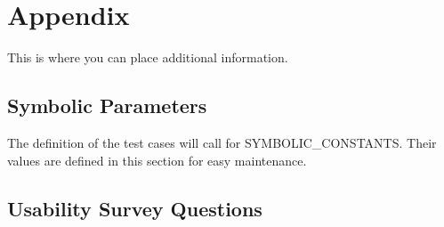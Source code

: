 \documentclass[12pt, titlepage]{article}
\begin{document}
\newpage

\section{Appendix}

This is where you can place additional information.

\subsection{Symbolic Parameters}

The definition of the test cases will call for SYMBOLIC\_CONSTANTS.  Their
values are defined in this section for easy maintenance.

\subsection{Usability Survey Questions} \label{Survey}
\end{document}
